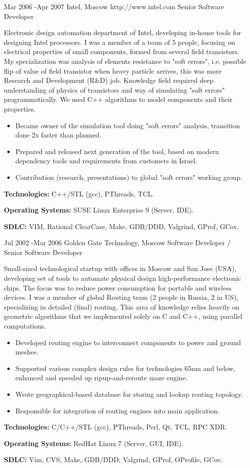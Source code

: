 \documentclass[10pt]{article} %
\begin{document}
\job
{Mar 2006 -}{Apr 2007}
{Intel, Moscow}
{http://www.intel.com}
{Senior Software Developer}
{Electronic design automation department of Intel, developing in-house tools for designing Intel processors.
I was a member of a team of 5 people, focusing on electrical properties of small components, formed from several 
field transistors. My specialization was analysis of elements resistance to "soft errors", i.e. possible
flip of value of field transistor when heavy particle arrives, this was more Research and Development (R\&D) job.
Knowledge field required deep understanding of physics of transistors and way of simulating "soft errors" programmatically.
We used C++ algorithms to model components and their properties.
\begin{itemize}
\item{Became owner of the simulation tool doing "soft errors" analysis, transition done 2x faster than planned.}
\item{Prepared and released next generation of the tool, based on modern dependency tools and requirements 
from customers in Israel.}
\item{Contribution (research, presentations) to global "soft errors" working group.}
\end{itemize}
\rule{0mm}{5mm}\textbf{Technologies:} C++/STL (gcc), PThreads, TCL.\\
\rule{0mm}{5mm}\textbf{Operating Systems:} SUSE Linux Enterprise 9 (Server, IDE).\\
\rule{0mm}{5mm}\textbf{SDLC:} VIM, Rational ClearCase, Make, GDB/DDD, Valgrind, GProf, GCov.
}


\job
{Jul 2002 -}{Mar 2006}
{Golden Gate Technology, Moscow}
{}
{Software Developer / Senior Software Developer}
{Small-sized technological startup with offices in Moscow and San Jose (USA), developing set of tools
to automate physical design high-performance electronic chips. The focus was to reduce power consumption
for portable and wireless devices. I was a member of global Routing team (2 people in Russia, 2 in US), 
specializing in detailed (final) routing. This area of knowledge relies heavily on geometric algorithms
that we implemented solely on C and C++, using parallel computations.
\begin{itemize}
\item{Developed routing engine to interconnect components to power and ground meshes.}
\item{Supported various complex design rules for technologies 65nm and below, enhanced and speeded up ripup-and-reroute maze engine.}
\item{Wrote geographical-based database for storing and lookup routing topology.}
\item{Responsible for integration of routing engines into main application.}
\end{itemize}
\rule{0mm}{5mm}\textbf{Technologies:} C/C++/STL (gcc), PThreads, Perl, Qt, TCL, RPC XDR.\\
\rule{0mm}{5mm}\textbf{Operating Systems:} RedHat Linux 7 (Server, GUI, IDE).\\
\rule{0mm}{5mm}\textbf{SDLC:} Vim, CVS, Make, GDB/DDD, Valgrind, GProf, OProfile, GCov.
}
\end{document}
